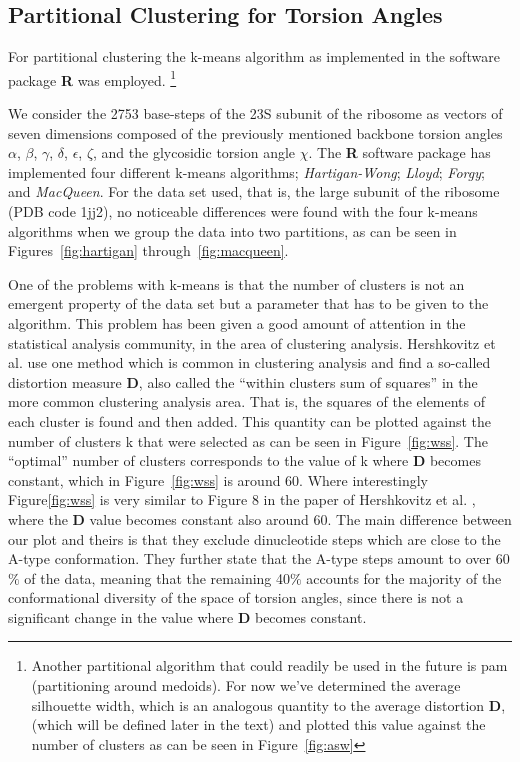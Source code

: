 \subsection{Partitional Clustering for Torsion Angles}
For  partitional clustering the k-means  algorithm as
implemented  in  the  software  package  \textbf{R}  \cite{Rproj} was employed.
\footnote{Another
partitional algorithm that could readily be used in the future is pam (partitioning  around medoids). For now we've determined
the average silhouette width, which is an analogous quantity
to the average distortion \textbf{D}, (which will be defined later in 
the text) and plotted this value against the number of clusters as can
be seen in Figure~\ref{fig:asw}}

We consider the  2753 base-steps  of the 23S  subunit of the  ribosome as
vectors  of  seven dimensions  composed  of  the previously  mentioned
backbone  torsion   angles  $\alpha$,  $\beta$,   $\gamma$,  $\delta$,
$\epsilon$,  $\zeta$, and  the  glycosidic torsion  angle $\chi$.  The
\textbf{R}  software  package has  implemented  four different  k-means
algorithms; \textit{Hartigan-Wong};   \textit{Lloyd};
\textit{Forgy}; and \textit{MacQueen}. For the data set used, that is,
the  large subunit  of the  ribosome  (PDB code  1jj2), no  noticeable
differences were  found with the four k-means
algorithms when we group  the data into two partitions, as can
be seen in Figures~\ref{fig:hartigan} through~\ref{fig:macqueen}.


One of the problems with k-means  is that the number of clusters is not
an emergent property  of the data set but  a parameter that has
to  be given  to the  algorithm. This  problem has  been given  a good
amount of attention in the statistical analysis community, in the area
of clustering  analysis. Hershkovitz  et al. \cite{hershkovitz2006} 
use  one method  which is
common in clustering analysis and  find a so-called distortion measure
\textbf{D}, also called the ``within clusters sum of squares'' in the more
common  clustering analysis  area. That  is, the squares of the
elements of each cluster is found and then added. This quantity can be plotted
against the number of clusters k that were selected as can be seen in
Figure~\ref{fig:wss}. The ``optimal''  number of clusters corresponds
to the value of k where \textbf{D} becomes constant,  which in
Figure~\ref{fig:wss} is
around 60. Where interestingly  Figure\ref{fig:wss}  is very
similar to Figure 8 in the paper of Hershkovitz et al.
\cite{hershkovitz2006}, where the \textbf{D} value becomes constant
also around 60.  The main
difference  between our  plot and  theirs is  that they  exclude
dinucleotide steps  which are close  to the A-type  conformation. They
further state  that the A-type steps amount to  over 60$\%$ of  the data, meaning
that  the   remaining  40$\%$  accounts   for  the  majority   of  the
conformational diversity  of the space of torsion  angles, since there
is  not a  significant change  in the  value where  \textbf{D} becomes
constant.

